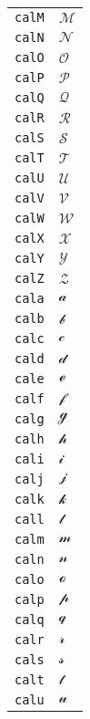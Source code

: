 \begin{longtable}{ll}
\texttt{calM}&${}{\mathcal{M}}{}$\\
\texttt{calN}&${}{\mathcal{N}}{}$\\
\texttt{calO}&${}{\mathcal{O}}{}$\\
\texttt{calP}&${}{\mathcal{P}}{}$\\
\texttt{calQ}&${}{\mathcal{Q}}{}$\\
\texttt{calR}&${}{\mathcal{R}}{}$\\
\texttt{calS}&${}{\mathcal{S}}{}$\\
\texttt{calT}&${}{\mathcal{T}}{}$\\
\texttt{calU}&${}{\mathcal{U}}{}$\\
\texttt{calV}&${}{\mathcal{V}}{}$\\
\texttt{calW}&${}{\mathcal{W}}{}$\\
\texttt{calX}&${}{\mathcal{X}}{}$\\
\texttt{calY}&${}{\mathcal{Y}}{}$\\
\texttt{calZ}&${}{\mathcal{Z}}{}$\\
\texttt{cala}&${}{\mathcal{a}}{}$\\
\texttt{calb}&${}{\mathcal{b}}{}$\\
\texttt{calc}&${}{\mathcal{c}}{}$\\
\texttt{cald}&${}{\mathcal{d}}{}$\\
\texttt{cale}&${}{\mathcal{e}}{}$\\
\texttt{calf}&${}{\mathcal{f}}{}$\\
\texttt{calg}&${}{\mathcal{g}}{}$\\
\texttt{calh}&${}{\mathcal{h}}{}$\\
\texttt{cali}&${}{\mathcal{i}}{}$\\
\texttt{calj}&${}{\mathcal{j}}{}$\\
\texttt{calk}&${}{\mathcal{k}}{}$\\
\texttt{call}&${}{\mathcal{l}}{}$\\
\texttt{calm}&${}{\mathcal{m}}{}$\\
\texttt{caln}&${}{\mathcal{n}}{}$\\
\texttt{calo}&${}{\mathcal{o}}{}$\\
\texttt{calp}&${}{\mathcal{p}}{}$\\
\texttt{calq}&${}{\mathcal{q}}{}$\\
\texttt{calr}&${}{\mathcal{r}}{}$\\
\texttt{cals}&${}{\mathcal{s}}{}$\\
\texttt{calt}&${}{\mathcal{t}}{}$\\
\texttt{calu}&${}{\mathcal{u}}{}$\\

\end{longtable}
